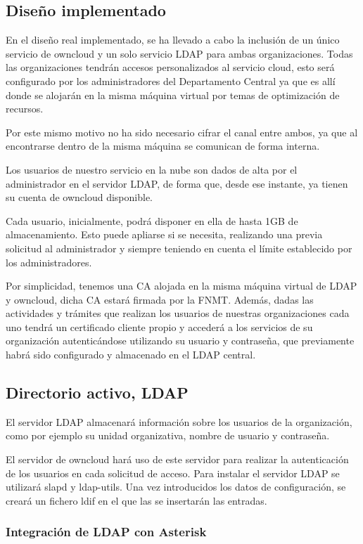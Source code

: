 \documentclass[a4paper]{article}
\begin{document}
\subsection{Diseño implementado}
En el diseño real implementado, se ha llevado a cabo la inclusión de un único servicio
de owncloud y un solo servicio LDAP para ambas organizaciones. Todas las organizaciones tendrán accesos personalizados al servicio cloud, esto será configurado por los administradores del Departamento Central ya que es allí donde se alojarán en la misma máquina virtual por temas de optimización de recursos. 

\newpage Por este mismo motivo no ha sido necesario cifrar el canal entre ambos, ya
que al encontrarse dentro de la misma máquina se comunican de forma interna.

Los usuarios de nuestro servicio en la nube son dados de alta por el administrador en el
servidor LDAP, de forma que, desde ese instante, ya tienen su cuenta de owncloud
disponible. 

Cada usuario, inicialmente, podrá disponer en ella de hasta 1GB de almacenamiento. Esto puede apliarse si se necesita, realizando una previa solicitud al administrador y siempre teniendo en cuenta el límite establecido por los administradores.

Por simplicidad, tenemos una CA alojada en la misma máquina virtual de LDAP y owncloud, dicha CA estará firmada por la FNMT. Además, dadas las actividades y trámites que realizan los usuarios de nuestras organizaciones cada uno tendrá un certificado cliente propio y accederá a los servicios de su organización autenticándose utilizando su usuario y contraseña, que previamente habrá sido configurado y almacenado en el LDAP central.

\subsection{Directorio activo, LDAP}
El servidor LDAP almacenará información sobre los usuarios de la organización, como
por ejemplo su unidad organizativa, nombre de usuario y contraseña. 

 El servidor de owncloud hará uso de este servidor para realizar la autenticación de los
usuarios en cada solicitud de acceso. Para instalar el servidor LDAP se utilizará slapd y ldap-utils. Una vez introducidos los datos de configuración, se creará un fichero ldif en el que las se insertarán las entradas. 
\subsubsection{Integración de LDAP con Asterisk}
\end{document}
